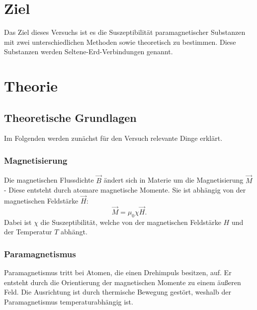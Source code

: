 \section{Ziel}
Das Ziel dieses Versuchs ist es die Suszeptibilität paramagnetischer Substanzen mit
zwei unterschiedlichen Methoden sowie theoretisch zu bestimmen.
Diese Substanzen werden Seltene-Erd-Verbindungen genannt. 

\section{Theorie}
\label{sec:Theorie}


\subsection{Theoretische Grundlagen}
Im Folgenden werden zunächst für den Versuch relevante Dinge erklärt.

\subsubsection{Magnetisierung}
Die magnetischen Flussdichte $\vec{B}$ ändert sich in Materie um die Magnetisierung $\vec{M}$-
Diese entsteht durch atomare magnetische Momente. %
Sie ist abhängig von der magnetischen Feldstärke $\vec{H}$:
\begin{equation*}
    \vec{M} = \mu_0 \chi \vec{H}.
    \label{eqn:magnetisierung}
\end{equation*}
Dabei ist $\chi$ die Suszeptibilität, welche von der magnetischen Feldstärke $H$ und 
der Temperatur $T$ abhängt. 

\subsubsection{Paramagnetismus}
Paramagnetismus tritt bei Atomen, die einen Drehimpuls besitzen, auf. 
Er entsteht durch die Orientierung der magnetischen Momente zu einem äußeren Feld. 
Die Ausrichtung ist durch thermische Bewegung gestört, weshalb der Paramagnetismus 
temperaturabhängig ist. 


